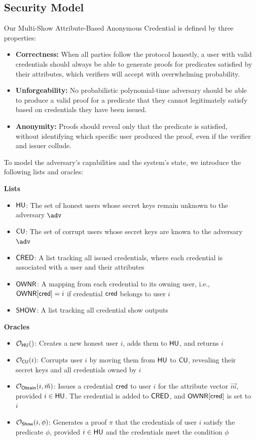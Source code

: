 \subsection{Security Model}

Our Multi-Show Attribute-Based Anonymous Credential is defined by three properties:

\begin{itemize}
    \item \textbf{Correctness:} When all parties follow the protocol honestly, a user with valid credentials should always be able to generate proofs for predicates satisfied by their attributes, which verifiers will accept with overwhelming probability.
    
    \item \textbf{Unforgeability:} No probabilistic polynomial-time adversary should be able to produce a valid proof for a predicate that they cannot legitimately satisfy based on credentials they have been issued.
    
    \item \textbf{Anonymity:} Proofs should reveal only that the predicate is satisfied, without identifying which specific user produced the proof, even if the verifier and issuer collude.
\end{itemize}

To model the adversary's capabilities and the system's state, we introduce the following lists and oracles:

\noindent\textbf{Lists}
\begin{itemize}
    \item $\mathsf{HU}$: The set of honest users whose secret keys remain unknown to the adversary $\adv$
    \item $\mathsf{CU}$: The set of corrupt users whose secret keys are known to the adversary $\adv$
    \item $\mathsf{CRED}$: A list tracking all issued credentials, where each credential is associated with a user and their attributes
    \item $\mathsf{OWNR}$: A mapping from each credential to its owning user, i.e., $\mathsf{OWNR}[\mathsf{cred}] = i$ if credential $\mathsf{cred}$ belongs to user $i$
    \item $\mathsf{SHOW}$: A list tracking all credential show outputs
\end{itemize} 

\noindent\textbf{Oracles}
\begin{itemize}
    \item $\mathcal{O}_{\mathsf{HU}}()$: Creates a new honest user $i$, adds them to $\mathsf{HU}$, and returns $i$
    \item $\mathcal{O}_{\mathsf{CU}}(i)$: Corrupts user $i$ by moving them from $\mathsf{HU}$ to $\mathsf{CU}$, revealing their secret keys and all credentials owned by $i$
    \item $\mathcal{O}_{\mathsf{Obtain}}(i, \vec{m})$: Issues a credential $\mathsf{cred}$ to user $i$ for the attribute vector $\vec{m}$, provided $i \in \mathsf{HU}$. The credential is added to $\mathsf{CRED}$, and $\mathsf{OWNR}[\mathsf{cred}]$ is set to $i$
    \item $\mathcal{O}_{\mathsf{Show}}(i, \phi)$: Generates a proof $\pi$ that the credentials of user $i$ satisfy the predicate $\phi$, provided $i \in \mathsf{HU}$ and the credentials meet the condition $\phi$
\end{itemize} 

